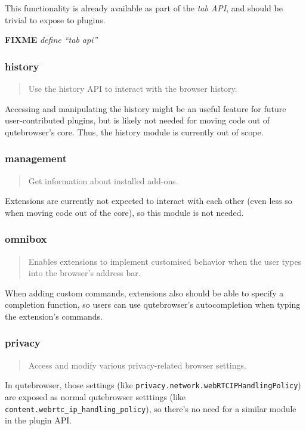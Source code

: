 \documentclass[a4paper,parskip=full]{scrreprt}
\newcommand{\fixme}[1]{\textbf{FIXME} \emph{#1}}
\begin{document}
This functionality is already available as part of the \emph{tab API}, and
should be trivial to expose to plugins.

\fixme{define ``tab api''}

\subsubsection{history}
\begin{quote}
Use the history API to interact with the browser history.
\end{quote}

Accessing and manipulating the history might be an useful feature for future
user-contributed plugins, but is likely not needed for moving code out of
qutebrowser's core. Thus, the history module is currently out of scope.

\subsubsection{management}
\begin{quote}
Get information about installed add-ons.
\end{quote}

Extensions are currently not expected to interact with each other (even less so
when moving code out of the core), so this module is not needed.

\subsubsection{omnibox}
\begin{quote}
Enables extensions to implement customised behavior when the user types into the
browser's address bar.
\end{quote}

When adding custom commands, extensions also should be able to specify a
completion function, so users can use qutebrowser's autocompletion when typing
the extension's commands.

\subsubsection{privacy}
\begin{quote}
Access and modify various privacy-related browser settings.
\end{quote}

In qutebrowser, those settings (like
\verb|privacy.network.webRTCIPHandlingPolicy|) are exposed as normal qutebrowser
setttings (like \verb|content.webrtc_ip_handling_policy|), so there's no need
for a similar module in the plugin API.
\end{document}
